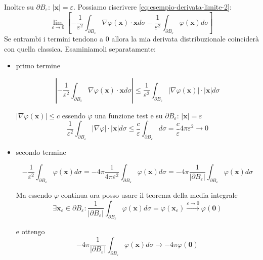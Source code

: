 \documentclass[10pt,a4paper,twoside,openright]{book}
\newcommand{\x}{\mathbf{x}}
\begin{document}
Inoltre su $\displaystyle \partial B_{\varepsilon }$: $\displaystyle | \x| =\varepsilon $. Possiamo riscrivere \eqref{eq:esempio-derivata-limite-2}:
\begin{equation*}
	\lim _{\varepsilon \rightarrow 0}\left[ -\frac{1}{\varepsilon ^{2}}\int _{\partial B_{\varepsilon }} \nabla \varphi (\x) \cdotp \x d\sigma -\frac{1}{\varepsilon ^{2}}\int _{\partial B_{\varepsilon }} \varphi (\x) d\sigma \right]
\end{equation*}
Se entrambi i termini tendono a $0$ allora la mia derivata distribuzionale coinciderà con quella classica. Esaminiamoli separatamente:
\begin{itemize}
	\item primo termine
	      
	      \begin{equation*}
	      	\left| -\frac{1}{\varepsilon ^{2}}\int _{\partial B_{\varepsilon }} \nabla \varphi (\x) \cdotp \x d\sigma \right| \leqslant \frac{1}{\varepsilon ^{2}}\int _{\partial B_{\varepsilon }}| \nabla \varphi (\x)| \cdotp | \x| d\sigma 
	      \end{equation*}
	      
	      $\displaystyle | \nabla \varphi (\x)| \leqslant c$ essendo $\displaystyle \varphi $ una funzione test e su $\displaystyle \partial B_{\varepsilon }$: $\displaystyle | \x| =\varepsilon $
	      \begin{equation*}
	      	\frac{1}{\varepsilon ^{2}}\int _{\partial B_{\varepsilon }}| \nabla \varphi | \cdotp | \x| d\sigma \leqslant \frac{c}{\varepsilon }\int _{\partial B_{\varepsilon }} d\sigma =\frac{c}{\varepsilon } 4\pi \varepsilon ^{2}\rightarrow 0
	      \end{equation*}
	\item secondo termine
	      
	      \begin{equation*}
	      	-\frac{1}{\varepsilon ^{2}}\int _{\partial B_{\varepsilon }} \varphi (\x) d\sigma =-4\pi \frac{1}{4\pi \varepsilon ^{2}}\int _{\partial B_{\varepsilon }} \varphi (\x) d\sigma =-4\pi \frac{1}{| \partial B_{\varepsilon }| }\int _{\partial B_{\varepsilon }} \varphi (\x) d\sigma 
	      \end{equation*}
	      
	      Ma essendo $\displaystyle \varphi $ continua ora posso usare il teorema della media integrale\begin{equation*}
	      \exists \x_{\varepsilon } \in \partial B_{\varepsilon } :\frac{1}{| \partial B_{\varepsilon }| }\int _{\partial B_{\varepsilon }} \varphi (\x) d\sigma =\varphi (\x_{\varepsilon })\xrightarrow{\varepsilon \rightarrow 0} \varphi (\mathbf{0})
	\end{equation*}
	
	e ottengo\begin{equation*}
	-4\pi \frac{1}{| \partial B_{\varepsilon }| }\int _{\partial B_{\varepsilon }} \varphi (\x) d\sigma \rightarrow -4\pi \varphi (\mathbf{0})
	\end{equation*}
\end{itemize}
\end{document}
